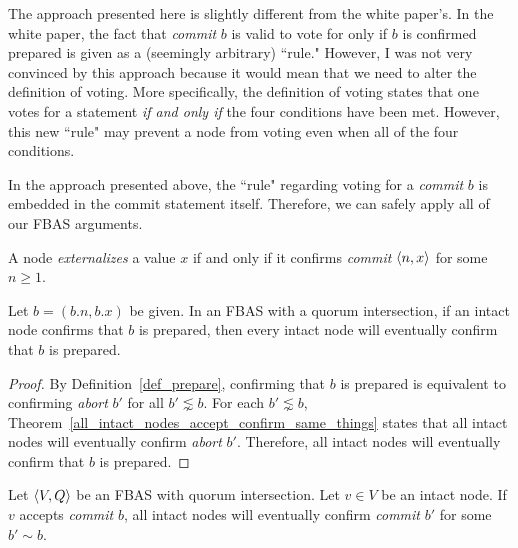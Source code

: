 \begin{rem}
    The approach presented here is slightly different from the white paper's.
    In the white paper, the fact that \textit{commit} $b$ is valid to vote for only if $b$ is confirmed prepared is given as a (seemingly arbitrary) ``rule."
    However, I was not very convinced by this approach because it would mean that we need to alter the definition of voting.
    More specifically, the definition of voting states that one votes for a statement \textit{if and only if} the four conditions have been met.  
    However, this new ``rule" may prevent a node from voting even when all of the four conditions.

    In the approach presented above, the ``rule" regarding voting for a \textit{commit} $b$ is embedded in the commit statement itself.
    Therefore, we can safely apply all of our FBAS arguments.
\end{rem}

\begin{defn}[Externalize]
    A node \textit{externalizes} a value $x$ if and only if it confirms \textit{commit} $\ev{n, x}$ for some $n \geq 1$.
\end{defn}

\begin{thm}
    Let $b = (b.n, b.x)$ be given.
    In an FBAS with a quorum intersection, if an intact node confirms that $b$ is prepared, then every intact node will eventually confirm that $b$ is prepared.
\end{thm}

\begin{proof}
    By Definition~\ref{def_prepare}, confirming that $b$ is prepared is equivalent to confirming \textit{abort} $b'$ for all  $b' \lnsim  b$.
    For each $b' \lnsim b$, Theorem~\ref{all_intact_nodes_accept_confirm_same_things} states that all intact nodes will eventually confirm \textit{abort} $b'$.
    Therefore, all intact nodes will eventually confirm that $b$ is prepared.
\end{proof}

\begin{thm}
    Let $\ev{V, Q}$ be an FBAS with quorum intersection.
    Let $v \in V$ be an intact node.
    If $v$ accepts \textit{commit} $b$, all intact nodes will eventually confirm \textit{commit} $b'$ for some $b' \sim b$.
\end{thm}

